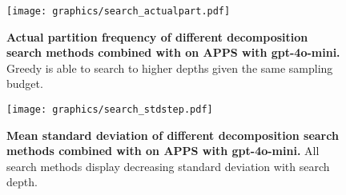 \begin{figure}[ht]
    \centering
    \texttt{[image: graphics/search\_actualpart.pdf]}
    \caption{\textbf{Actual partition frequency of different decomposition search methods combined with \decomp on APPS with gpt-4o-mini.} Greedy is able to search to higher depths given the same sampling budget.}
    \label{fig:search_actualpart}
\end{figure}

\begin{figure}[ht]
    \centering
    \texttt{[image: graphics/search\_stdstep.pdf]}
    \caption{\textbf{Mean standard deviation of different decomposition search methods combined with \decomp on APPS with gpt-4o-mini.} All search methods display decreasing standard deviation with search depth.}
    \label{fig:search_stdstep}
\end{figure}



